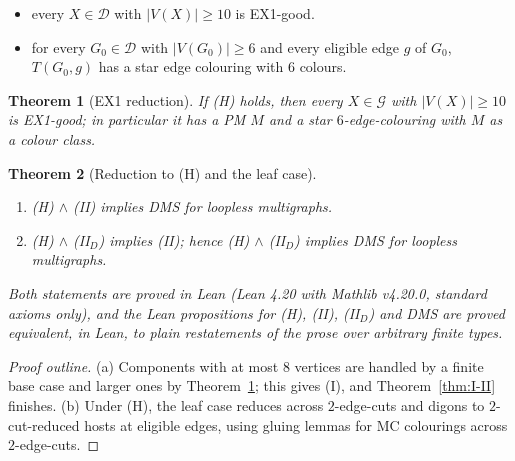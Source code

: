 \documentclass[11pt]{amsart}
\newtheorem{theorem}{Theorem}[section]
\theoremstyle{definition}
\theoremstyle{remark}
\newcommand{\cG}{\mathcal{G}}
\newcommand{\cD}{\mathcal{D}}
\newcommand{\hyp}[1]{\textup{(#1)}}
\newcommand{\Lean}{\textsf{Lean}}
\begin{document}
\begin{itemize}
\item[\hyp{H}] every $X\in\cD$ with $|V(X)|\ge 10$ is EX1-good.
\item[\hyp{II$_D$}] for every $G_0\in\cD$ with $|V(G_0)|\ge 6$ and every eligible edge $g$ of $G_0$, $T(G_0,g)$ has a star edge colouring with $6$ colours.
\end{itemize}

\begin{theorem}[EX1 reduction]\label{thm:ex1red}
If \hyp{H} holds, then every $X\in\cG$ with $|V(X)|\ge 10$ is EX1-good; in particular it has a PM $M$ and a star $6$-edge-colouring with $M$ as a colour class.
\end{theorem}

\begin{theorem}[Reduction to \hyp{H} and the leaf case]\label{thm:rh2}
\begin{enumerate}[label=(\alph*)]
\item \hyp{H} $\wedge$ \hyp{II} implies DMS for loopless multigraphs.
\item \hyp{H} $\wedge$ \hyp{II$_D$} implies \hyp{II}; hence \hyp{H} $\wedge$ \hyp{II$_D$} implies DMS for loopless multigraphs.
\end{enumerate}
Both statements are proved in \Lean{} (Lean 4.20 with Mathlib v4.20.0, standard axioms only), and the Lean propositions for \hyp{H}, \hyp{II}, \hyp{II$_D$} and DMS are proved equivalent, in \Lean, to plain restatements of the prose over arbitrary finite types.
\end{theorem}
\begin{proof}[Proof outline]
(a) Components with at most $8$ vertices are handled by a finite base case
and larger ones by Theorem~\ref{thm:ex1red}; this gives \hyp{I}, and Theorem~\ref{thm:I-II} finishes. (b) Under \hyp{H}, the leaf case reduces across $2$-edge-cuts and digons to $2$-cut-reduced hosts at eligible edges, using gluing lemmas for MC colourings across $2$-edge-cuts.
\end{proof}
\end{document}
